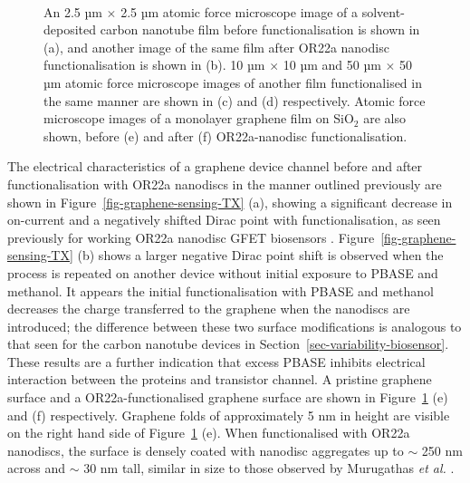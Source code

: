 \documentclass[
  a4paper,
]{scrbook}
\begin{document}
\begin{figure}
\begin{minipage}[t]{0.01\linewidth}
{\centering 

~

}

\end{minipage}%

\caption[2.5 µm \(\times\) 2.5 µm, 10 µm \(\times\) 10 µm and 50 µm
\(\times\) 50 µm atomic force microscope images of a solvent-deposited
carbon nanotube film before and after OR22a nanodisc functionalisation,
alongside images of a monolayer graphene film before and after OR22a
nanodisc
functionalisation.]{\label{fig-solvent-deposited-AFM-comparison}An 2.5
µm \(\times\) 2.5 µm atomic force microscope image of a
solvent-deposited carbon nanotube film before functionalisation is shown
in (a), and another image of the same film after OR22a nanodisc
functionalisation is shown in (b). 10 µm \(\times\) 10 µm and 50 µm
\(\times\) 50 µm atomic force microscope images of another film
functionalised in the same manner are shown in (c) and (d) respectively.
Atomic force microscope images of a monolayer graphene film on SiO\(_2\)
are also shown, before (e) and after (f) OR22a-nanodisc
functionalisation.}

\end{figure}

The electrical characteristics of a graphene device channel before and
after functionalisation with OR22a nanodiscs in the manner outlined
previously are shown in Figure~\ref{fig-graphene-sensing-TX} (a),
showing a significant decrease in on-current and a negatively shifted
Dirac point with functionalisation, as seen previously for working OR22a
nanodisc GFET biosensors \autocite{Murugathas2020}.
Figure~\ref{fig-graphene-sensing-TX} (b) shows a larger negative Dirac
point shift is observed when the process is repeated on another device
without initial exposure to PBASE and methanol. It appears the initial
functionalisation with PBASE and methanol decreases the charge
transferred to the graphene when the nanodiscs are introduced; the
difference between these two surface modifications is analogous to that
seen for the carbon nanotube devices in
Section~\ref{sec-variability-biosensor}. These results are a further
indication that excess PBASE inhibits electrical interaction between the
proteins and transistor channel. A pristine graphene surface and a
OR22a-functionalised graphene surface are shown in
Figure~\ref{fig-solvent-deposited-AFM-comparison} (e) and (f)
respectively. Graphene folds of approximately 5 nm in height are visible
on the right hand side of
Figure~\ref{fig-solvent-deposited-AFM-comparison} (e). When
functionalised with OR22a nanodiscs, the surface is densely coated with
nanodisc aggregates up to \(\sim\) 250 nm across and \(\sim\) 30 nm
tall, similar in size to those observed by Murugathas \emph{et al.}
\autocite{Murugathas2020}.
\end{document}
